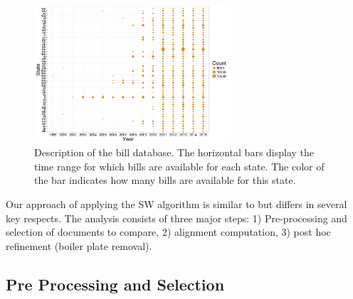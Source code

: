 \documentclass[12pt]{article} %
\begin{document}
\begin{figure}[ht!]
    \centering
    \includegraphics[width=0.65\textwidth]{figures/year_count_by_state.png}
    \caption{Description of the bill database. The horizontal bars display the time range for which bills are available for each state. The color of the bar indicates how many bills are available for this state.}
    \label{fig:bill_desc}
\end{figure}

Our approach of applying the SW algorithm is similar to
\citet{wilkerson2015tracing} but differs in several key respects. The analysis
consists of three major steps: 1) Pre-processing and selection of documents to compare, 2) alignment computation, 3) post hoc refinement (boiler plate removal). 

\subsection{Pre Processing and Selection}
\end{document}
